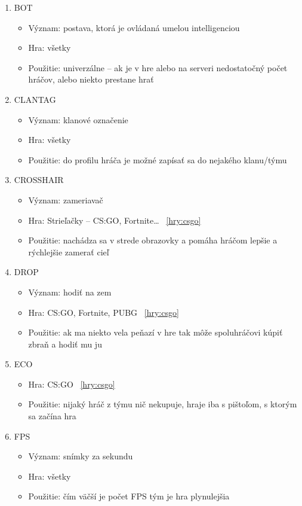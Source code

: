 \documentclass[10pt,oneside,slovak,a4paper]{article}
\begin{document}
\begin{multicols}{2}
\begin{enumerate}
\item BOT
\begin{itemize}
 \item Význam: postava, ktorá je ovládaná umelou intelligenciou
 \item Hra: všetky
 \item Použitie: univerzálne – ak je v hre alebo na serveri nedostatočný počet hráčov, alebo niekto prestane hrať
\cite{a1}
\end{itemize}

\item CLANTAG
\begin{itemize}
 \item Význam: klanové označenie
 \item Hra: všetky
 \item Použitie: do profilu hráča je možné zapísať sa do nejakého klanu/týmu
\cite{a1}
\end{itemize}

\item CROSSHAIR
\begin{itemize}
 \item Význam: zameriavač
 \item Hra: Strieľačky – CS:GO, Fortnite… ~\ref{hry:csgo}
 \item Použitie: nachádza sa v strede obrazovky a pomáha hráčom lepšie a rýchlejšie zamerať cieľ
\cite{a1}
\end{itemize}
 
\item DROP
\begin{itemize}
 \item Význam: hodiť na zem
 \item Hra: CS:GO, Fortnite, PUBG ~\ref{hry:csgo}
 \item Použitie: ak ma niekto vela peňazí v hre tak môže spoluhráčovi kúpiť zbraň a hodiť mu ju
\cite{a1}
\end{itemize}

\item ECO
\begin{itemize}
 \item Hra: CS:GO ~\ref{hry:csgo}
 \item Použitie: nijaký hráč z týmu nič nekupuje, hraje iba s pištoľom, s ktorým sa začína hra
\cite{a1}
\end{itemize}

\item FPS
\begin{itemize}
 \item Význam: snímky za sekundu
 \item Hra: všetky
 \item Použitie: čím väčší je počet FPS tým je hra plynulejšia 
\cite{a1}
\end{itemize}
 

\end{enumerate}
\end{multicols}
\end{document}

